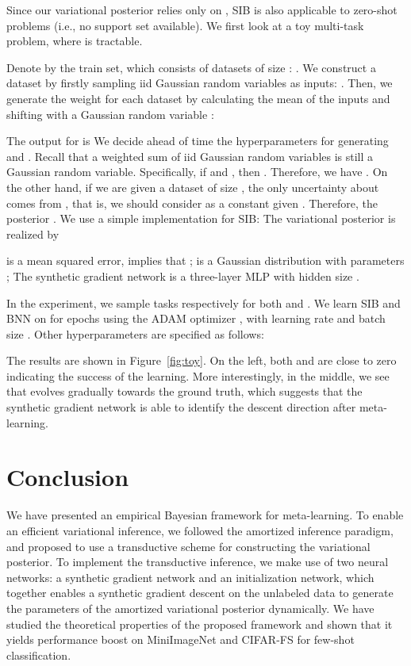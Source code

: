 \documentclass{article} \usepackage{iclr2020_conference,times}
\begin{document}
Since our variational posterior relies only on , SIB is also applicable to zero-shot problems (i.e., no support set available).
We first look at a toy multi-task problem, where  is tractable.

Denote by  the train set, which consists of datasets of size : .
We construct a dataset  by firstly sampling iid Gaussian random variables as inputs: .
Then, we generate the weight for each dataset by calculating the mean of the inputs and shifting with a Gaussian random variable :

The output for  is 
We decide ahead of time the hyperparameters  for generating  and . 
Recall that a weighted sum of iid Gaussian random variables is still a Gaussian random variable.
Specifically, if  and , 
then .
Therefore, we have .
On the other hand, if we are given a dataset  of size , the only uncertainty about  comes from ,
that is, we should consider  as a constant given .
Therefore, the posterior .
We use a simple implementation for SIB:
The variational posterior is realized by
    
 is a mean squared error, implies that ;
 is a Gaussian distribution with parameters ;
The synthetic gradient network  is a three-layer MLP with hidden size .

In the experiment, we sample  tasks respectively for both  and .
We learn SIB and BNN on  for  epochs using the ADAM optimizer \citep{kingma2014adam}, with learning rate 
and batch size .
Other hyperparameters are specified as follows:

The results are shown in Figure~\ref{fig:toy}. On the left, both 
 and  are close to zero
indicating the success of the learning. 
More interestingly, in the middle, we see that  evolves gradually towards the ground truth,
which suggests that the synthetic gradient network is able to identify the descent direction after meta-learning.





 

\section{Conclusion}

We have presented an empirical Bayesian framework for meta-learning. 
To enable an efficient variational inference, we followed the amortized inference paradigm,
and proposed to use a transductive scheme for constructing the variational posterior.
To implement the transductive inference, we make use of two neural networks:
a synthetic gradient network and an initialization network,
which together enables a synthetic gradient descent on the unlabeled data 
to generate the parameters of the amortized variational posterior dynamically.
We have studied the theoretical properties of the proposed framework 
and shown that it yields performance boost on MiniImageNet and CIFAR-FS for few-shot classification.
\end{document}
